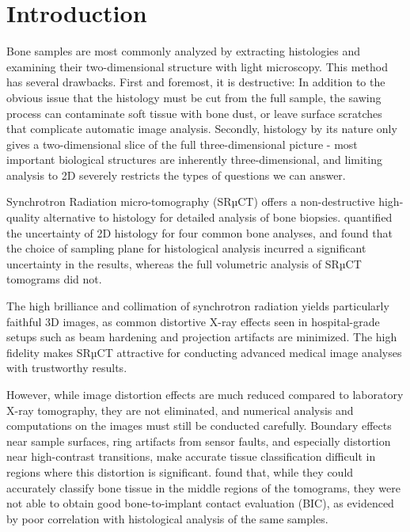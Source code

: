 \section{Introduction}
\label{sec:intro}


Bone samples are most commonly analyzed by extracting histologies and examining
their two-dimensional structure with light microscopy. This method has several
drawbacks. First and foremost, it is destructive: In addition to the obvious
issue that the histology must be cut from the full sample, the sawing process
can contaminate soft tissue with bone dust, or leave surface scratches that
complicate automatic image analysis. Secondly, histology by its nature only
gives a two-dimensional slice of the full three-dimensional picture - most
important biological structures are inherently three-dimensional, and limiting
analysis to 2D severely restricts the types of questions we can answer.

Synchrotron Radiation micro-tomography (SRµCT) offers a non-destructive
high-quality alternative to histology for detailed analysis of bone biopsies.
\cite{torsten2018} quantified the uncertainty of 2D histology for four common
bone analyses, and found that the choice of sampling plane for histological
analysis incurred a significant uncertainty in the results, whereas the full
volumetric analysis of SRµCT tomograms did not.

The high brilliance and collimation of synchrotron radiation yields
particularly faithful 3D images, as common distortive X-ray effects seen in
hospital-grade setups such as beam hardening and projection artifacts are
minimized. The high fidelity makes SRµCT attractive for conducting advanced
medical image analyses with trustworthy results.

However, while image distortion effects are much reduced compared to laboratory
X-ray tomography, they are not eliminated, and numerical analysis and
computations on the images must still be conducted carefully. Boundary effects
near sample surfaces, ring artifacts from sensor faults, and especially
distortion near high-contrast transitions, make accurate tissue classification
difficult in regions where this distortion is significant. \cite{sporring}
found that, while they could accurately classify bone tissue in the middle
regions of the tomograms, they were not able to obtain good bone-to-implant
contact evaluation (BIC), as evidenced by poor correlation with histological
analysis of the same samples.

